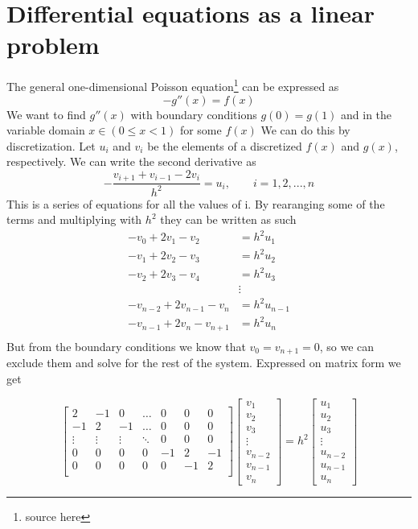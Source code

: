 \documentclass[10pt,a4paper]{article}
\begin{document}
    \section{Differential equations as a linear problem}
    The general one-dimensional Poisson equation\footnote{source here} can be expressed as
    \[
    -g''(x) = f(x)
    \]
    We want to find $g''(x)$ with boundary conditions $g(0) = g(1)$ and in the variable domain $x\in (0\leq x<1)$ for some $f(x)$
    We can do this by discretization. Let $u_i$ and $v_i$ be the elements of a discretized $f(x)$ and $g(x)$, respectively. We can write the second derivative as
    $$-\frac{v_{i+1}+v_{i-1}-2v_i}{h^2} = u_i, \qquad i = 1,2,...,n$$
    This is a series of equations for all the values of i. By rearanging some of the terms and multiplying with $h^2$ they can be written as such
    \begin{align*}
        -v_0 + 2v_1 - v_2 &= h^2u_1\\
        -v_1 + 2v_2 - v_3 &= h^2u_2\\
        -v_2 + 2v_3 - v_4 &= h^2u_3\\
        &\vdots\\
        -v_{n-2} + 2v_{n-1} - v_{n} &= h^2u_{n-1}\\
        -v_{n-1} + 2v_{n} - v_{n+1} &= h^2u_{n}\\
    \end{align*}
    But from the boundary conditions we know that $v_0 = v_{n+1} = 0$, so we can exclude them and solve for the rest of the system. Expressed on matrix form we get

    \begin{equation}\label{special matrix}
    \begin{bmatrix}
    2 & -1 & 0 & \dots & 0 & 0 & 0 \\
    -1 & 2 & -1 & \dots & 0 & 0 & 0 \\
    \vdots & \vdots & \vdots & \ddots & 0 & 0 & 0 \\
    0 & 0 & 0 & 0 & -1 & 2 & -1\\
    0 & 0 & 0 & 0 & 0 & -1 & 2 \\
    \end{bmatrix}
    \begin{bmatrix}
        v_1\\ v_2 \\ v_3 \\ \vdots \\ v_{n-2} \\v_{n-1} \\ v_{n}
    \end{bmatrix}
    =h^2
    \begin{bmatrix}
        u_1 \\ u_2 \\ u_3 \\ \vdots \\ u_{n-2} \\ u_{n-1} \\ u_{n}
    \end{bmatrix}
    \end{equation}
\end{document}
